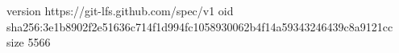 version https://git-lfs.github.com/spec/v1
oid sha256:3e1b8902f2e51636c714f1d994fc1058930062b4f14a59343246439c8a9121cc
size 5566
